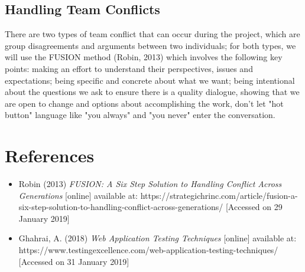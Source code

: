 \documentclass{article}
\begin{document}
	\subsection{Handling Team Conflicts}
	There are two types of team conflict that can occur during the project, which are group disagreements and arguments between two individuals; for both types, we will use the FUSION method (Robin, 2013) which involves the following key points: making an effort to understand their perspectives, issues and expectations; being specific and concrete about what we want; being intentional about the questions we ask to ensure there is a quality dialogue, showing that we are open to change and options about accomplishing the work, don't let "hot button" language like "you always" and "you never" enter the conversation.

\section{References}
\begin{itemize}
\item Robin (2013) \textit{FUSION: A Six Step Solution to Handling Conflict Across Generations} [online] available at: https://strategichrinc.com/article/fusion-a-six-step-solution-to-handling-conflict-across-generations/ [Accessed on 29 January 2019]
\item Ghahrai, A. (2018) \textit{Web Application Testing Techniques} [online] available at: https://www.testingexcellence.com/web-application-testing-techniques/ [Accessed on 31 January 2019]
\end{itemize}
\end{document}
